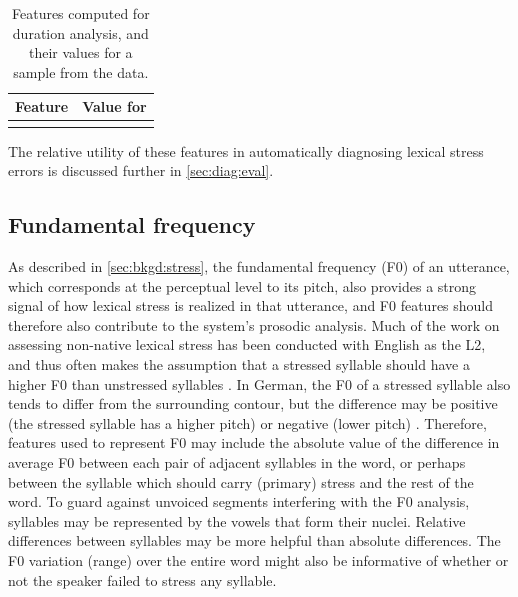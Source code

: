 \begin{table}[htb]
		\centering
		\caption{Features computed for duration analysis, and their values for a sample from the data.}
		\begin{tabular}{ll}
		\toprule
		Feature  & Value for \TODO{} \\
		\midrule
		\TODO{} & \\
		\bottomrule
		\end{tabular}
		\label{tab:durationfeatures}
\end{table}

The relative utility of these features in automatically diagnosing lexical stress errors is discussed further in \cref{sec:diag:eval}.


	\subsection{Fundamental frequency}
	\label{sec:prosody:f0}
	As described in \cref{sec:bkgd:stress}, the fundamental frequency (F0) of an utterance, which corresponds at the perceptual level to its pitch, also provides a strong signal of how lexical stress is realized in that utterance, and F0 features should therefore also contribute to the system's prosodic analysis. 
	Much of the work on assessing non-native lexical stress has been conducted with English as the L2, and thus often makes the assumption that a stressed syllable should have a higher F0 than unstressed syllables \citep{Bonneau2011}. In German, the F0 of a stressed syllable also tends to differ from the surrounding contour, but the difference may be positive (the stressed syllable has a higher pitch) or negative (lower pitch) \citep[p.~267]{Cutler2005}. Therefore, features used to represent F0 may include the absolute value of the difference in average F0 between each pair of adjacent syllables in the word, or perhaps between the syllable which should carry (primary) stress and the rest of the word. To guard against unvoiced segments interfering with the F0 analysis, syllables may be represented by the vowels that form their nuclei. Relative differences between syllables may be more helpful than absolute differences. The F0 variation (range) over the entire word might also be informative of whether or not the speaker failed to stress any syllable.%
	



